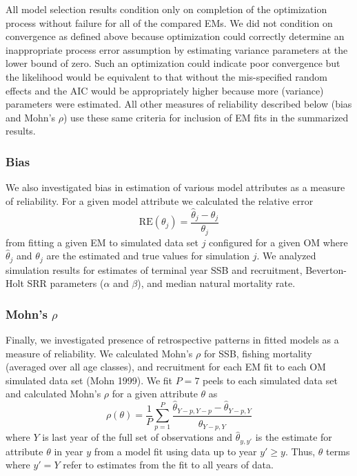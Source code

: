 \documentclass[
  12pt,
]{article}
\begin{document}
All model selection results condition only on completion of the
optimization process without failure for all of the compared EMs. We did
not condition on convergence as defined above because optimization could
correctly determine an inappropriate process error assumption by
estimating variance parameters at the lower bound of zero. Such an
optimization could indicate poor convergence but the likelihood would be
equivalent to that without the mis-specified random effects and the AIC
would be appropriately higher because more (variance) parameters were
estimated. All other measures of reliability described below (bias and
Mohn's \(\rho\)) use these same criteria for inclusion of EM fits in the
summarized results.

\subsubsection*{Bias}\label{bias}

We also investigated bias in estimation of various model attributes as a
measure of reliability. For a given model attribute we calculated the
relative error \begin{equation}\label{relerror}
\text{RE}\left(\theta_j\right) = \frac{\widehat \theta_j - \theta_j}{\theta_j}
\end{equation} from fitting a given EM to simulated data set \(j\)
configured for a given OM where \(\widehat \theta_j\) and \(\theta_j\)
are the estimated and true values for simulation \(j\). We analyzed
simulation results for estimates of terminal year SSB and recruitment,
Beverton-Holt SRR parameters (\(\alpha\) and \(\beta\)), and median
natural mortality rate.

\subsubsection*{\texorpdfstring{Mohn's
\(\rho\)}{Mohn's \textbackslash rho}}\label{mohns-rho}

Finally, we investigated presence of retrospective patterns in fitted
models as a measure of reliability. We calculated Mohn's \(\rho\) for
SSB, fishing mortality (averaged over all age classes), and recruitment
for each EM fit to each OM simulated data set (Mohn 1999). We fit
\(P = 7\) peels to each simulated data set and calculated Mohn's
\(\rho\) for a given attribute \(\theta\) as
\begin{equation}\label{mohns_rho}
\rho\left(\theta\right) = \frac{1}{P}\sum^P_{p=1} \frac{\widehat \theta_{Y-p,Y-p} - \widehat\theta_{Y-p,Y}}{\widehat\theta_{Y-p,Y}}
\end{equation} where \(Y\) is last year of the full set of observations
and \(\widehat \theta_{y,y'}\) is the estimate for attribute \(\theta\)
in year \(y\) from a model fit using data up to year \(y'\geq y\). Thus,
\(\theta\) terms where \(y'=Y\) refer to estimates from the fit to all
years of data.
\end{document}

